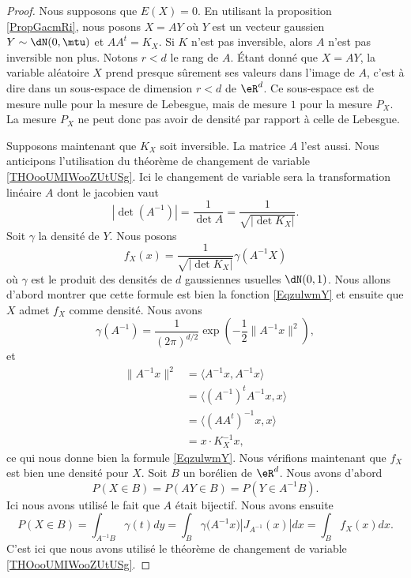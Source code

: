 \begin{proof}
    Nous supposons que \( E(X)=0\). En utilisant la proposition \ref{PropGacmRi}, nous posons \( X=AY\) où \( Y\) est un vecteur gaussien \( Y\sim\dN(0,\mtu)\) et \( AA^t=K_X\). Si \( K\) n'est pas inversible, alors \( A\) n'est pas inversible non plus. Notons \( r<d\) le rang de \( A\). Étant donné que \( X=AY\), la variable aléatoire \( X\) prend presque sûrement ses valeurs dans l'image de \( A\), c'est à dire dans un sous-espace de dimension \( r<d\) de \( \eR^d\). Ce sous-espace est de mesure nulle pour la mesure de Lebesgue, mais de mesure \( 1\) pour la mesure \( P_X\). La mesure \( P_X\) ne peut donc pas avoir de densité par rapport à celle de Lebesgue.

    Supposons maintenant que \( K_X\) soit inversible. La matrice \( A\) l'est aussi. Nous anticipons l'utilisation du théorème de changement de variable \ref{THOooUMIWooZUtUSg}. Ici le changement de variable sera la transformation linéaire \( A\) dont le jacobien vaut
    \begin{equation}
        | \det(A^{-1}) |=\frac{1}{ \det A }=\frac{1}{ \sqrt{| \det K_X |} }.
    \end{equation}
    Soit \( \gamma\) la densité de \( Y\). Nous posons
    \begin{equation}
        f_X(x)=\frac{1}{\sqrt{| \det K_X |}} \gamma(A^{-1} X)
    \end{equation}
    où \( \gamma\) est le produit des densités de \( d\) gaussiennes usuelles \( \dN(0,1)\). Nous allons d'abord montrer que cette formule est bien la fonction \eqref{EqzulwmY} et ensuite que \( X\) admet \( f_X\) comme densité. Nous avons
    \begin{equation}
        \gamma(A^{-1})=\frac{1}{ (2\pi)^{d/2} }\exp\left( -\frac{ 1 }{2}\| A^{-1}x \|^2 \right),
    \end{equation}
    et 
    \begin{subequations}
        \begin{align}
            \| A^{-1}x \|^2&=\langle A^{-1}x, A^{-1}x\rangle \\
            &=\langle (A^{-1})^tA^{-1}x, x\rangle \\
            &=\langle (AA^t)^{-1}x, x\rangle \\
            &=x\cdot K_X^{-1}x,
        \end{align}
    \end{subequations}
    ce qui nous donne bien la formule \eqref{EqzulwmY}. Nous vérifions maintenant que \( f_X\) est bien une densité pour \( X\). Soit \( B\) un borélien de \( \eR^d\). Nous avons d'abord
    \begin{equation}
        P(X\in B)=P(AY\in B)=P(Y\in A^{-1}B).
    \end{equation}
    Ici nous avons utilisé le fait que \( A\) était bijectif. Nous avons ensuite
    \begin{equation}
            P(X\in B)=\int_{A^{-1}B}\gamma(t)dy
            =\int_B\gamma\big( A^{-1}x \big)| J_{A^{-1}}(x) |dx
            =\int_Bf_X(x)dx.
    \end{equation}
    C'est ici que nous avons utilisé le théorème de changement de variable \ref{THOooUMIWooZUtUSg}.
\end{proof}

